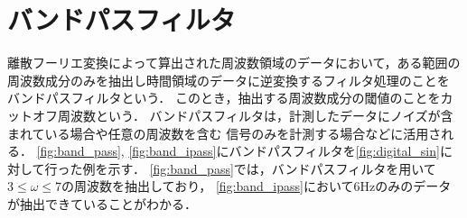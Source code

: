 \section{バンドパスフィルタ}


離散フーリエ変換によって算出された周波数領域のデータにおいて，ある範囲の
周波数成分のみを抽出し時間領域のデータに逆変換するフィルタ処理のことを
バンドパスフィルタという．
このとき，抽出する周波数成分の閾値のことをカットオフ周波数という．
バンドパスフィルタは，計測したデータにノイズが含まれている場合や任意の周波数を含む
信号のみを計測する場合などに活用される．
\autoref{fig:band_pass}, \autoref{fig:band_ipass}にバンドパスフィルタを\autoref{fig:digital_sin}に対して行った例を示す．
\autoref{fig:band_pass}では，バンドパスフィルタを用いて$3 \le \omega \le 7$の周波数を抽出しており，
\autoref{fig:band_ipass}において6Hzのみのデータが抽出できていることがわかる．

